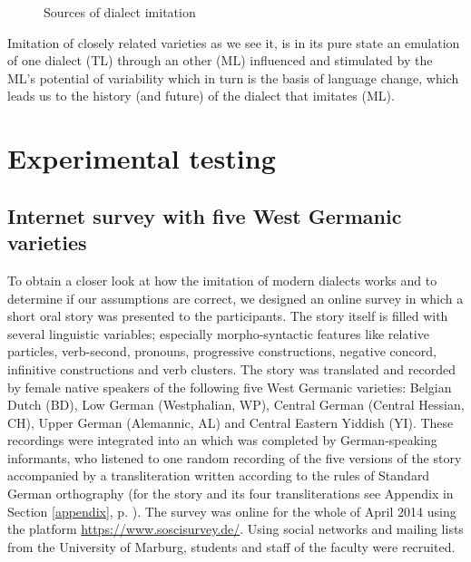\documentclass[output=paper]{LSP/langsci}
\begin{document}
\begin{figure}[htbp]
 \begin{center}
              \caption{Sources of dialect imitation}\label{imitationalssubtraktiveFarbmischung}	%
\end{center}
 \end{figure}


 
Imitation of closely related varieties as we see it, is in its pure state an emulation of one dialect (TL) through an other (ML) influenced and stimulated by the ML's potential of variability which in turn is the basis of language change, which leads us to the history (and future) of the dialect that imitates (ML).

 \section{Experimental testing}\label{experiment}
 
 
 \subsection{Internet survey with five West Germanic varieties }\label{online}

To obtain a closer look at how the imitation of modern dialects works and to determine if our assumptions are correct, we designed an online survey in which a short oral story was presented to the participants. The story itself is filled with several linguistic variables; especially morpho-syntactic features like relative particles, verb-second, pronouns, progressive constructions, negative concord, infinitive constructions and verb clusters. The story was translated and recorded by female native speakers of the following five West Germanic varieties: Belgian {Dutch} (BD), Low German (Westphalian, WP), Central German (Central Hessian, CH), Upper German (Alemannic, AL) and Central Eastern Yiddish (YI). These recordings were integrated into an  which was completed by German-speaking informants, who listened to one random recording of the five versions of the story accompanied by a transliteration written according to the rules of Standard German orthography (for the story and its four transliterations see Appendix in Section \ref{appendix}, p. \pageref{appendix}). The survey was online for the whole of April 2014 using the platform \url{https://www.soscisurvey.de/}. Using social networks and mailing lists from the University of Marburg, students and staff of the faculty were recruited.
\end{document}

